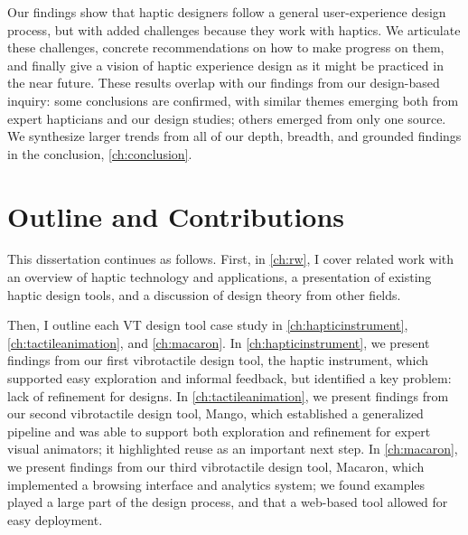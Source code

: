 Our findings show that haptic designers follow a general user-experience design process, but with added challenges because they work with haptics.
We articulate these challenges, concrete recommendations on how to make progress on them, and finally give a vision of haptic experience design as it might be practiced in the near future.
These results overlap with our findings from our design-based inquiry: some conclusions are confirmed, with similar themes emerging both from expert hapticians and our design studies; others emerged from only one source.
We synthesize larger trends from all of our depth, breadth, and grounded findings in the conclusion, \autoref{ch:conclusion}.




\section{Outline and Contributions}
This dissertation continues as follows.
First, in \autoref{ch:rw}, I cover related work with an overview of haptic technology and applications, a presentation of existing haptic design tools, and a discussion of design theory from other fields.

Then, I outline each VT design tool case study in \autoref{ch:hapticinstrument},  \autoref{ch:tactileanimation}, and \autoref{ch:macaron}.
In \autoref{ch:hapticinstrument}, we present findings from our first vibrotactile design tool, the haptic instrument, which supported easy exploration and informal feedback, but identified a key problem: lack of refinement for designs.
In \autoref{ch:tactileanimation}, we present findings from our second vibrotactile design tool, Mango, which established a generalized pipeline and was able to support both exploration and refinement for expert visual animators; it highlighted reuse as an important next step.
In \autoref{ch:macaron}, we present findings from our third vibrotactile design tool, Macaron, which implemented a browsing interface and analytics system; we found examples played a large part of the design process, and that a web-based tool allowed for easy deployment.

